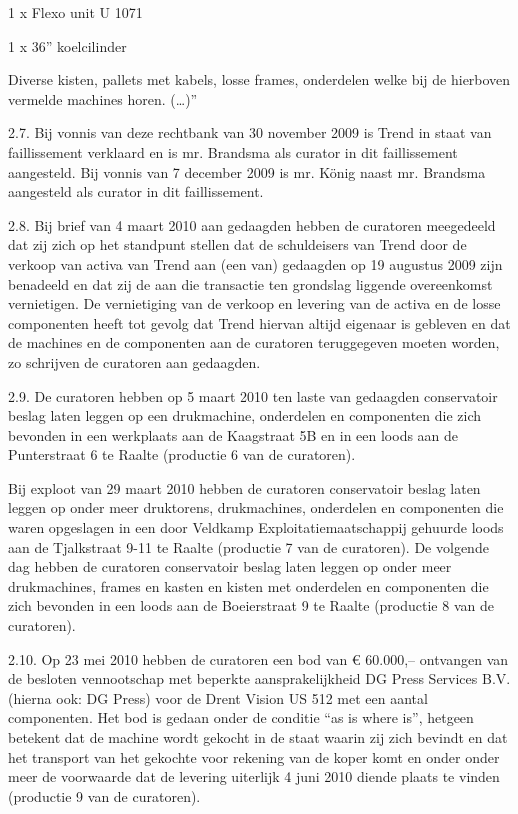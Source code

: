 \documentclass[
  dutch,
  a4paper,
]{article}
\begin{document}
1 x Flexo unit U 1071

1 x 36'' koelcilinder

Diverse kisten, pallets met kabels, losse frames, onderdelen welke bij de hierboven vermelde machines horen. (\ldots)''

2.7. Bij vonnis van deze rechtbank van 30 november 2009 is Trend in staat van faillissement verklaard en is mr. Brandsma als curator in dit faillissement aangesteld. Bij vonnis van 7 december 2009 is mr. König naast mr. Brandsma aangesteld als curator in dit faillissement.

2.8. Bij brief van 4 maart 2010 aan gedaagden hebben de curatoren meegedeeld dat zij zich op het standpunt stellen dat de schuldeisers van Trend door de verkoop van activa van Trend aan (een van) gedaagden op 19 augustus 2009 zijn benadeeld en dat zij de aan die transactie ten grondslag liggende overeenkomst vernietigen. De vernietiging van de verkoop en levering van de activa en de losse componenten heeft tot gevolg dat Trend hiervan altijd eigenaar is gebleven en dat de machines en de componenten aan de curatoren teruggegeven moeten worden, zo schrijven de curatoren aan gedaagden.

2.9. De curatoren hebben op 5 maart 2010 ten laste van gedaagden conservatoir beslag laten leggen op een drukmachine, onderdelen en componenten die zich bevonden in een werkplaats aan de Kaagstraat 5B en in een loods aan de Punterstraat 6 te Raalte (productie 6 van de curatoren).

Bij exploot van 29 maart 2010 hebben de curatoren conservatoir beslag laten leggen op onder meer druktorens, drukmachines, onderdelen en componenten die waren opgeslagen in een door Veldkamp Exploitatiemaatschappij gehuurde loods aan de Tjalkstraat 9-11 te Raalte (productie 7 van de curatoren). De volgende dag hebben de curatoren conservatoir beslag laten leggen op onder meer drukmachines, frames en kasten en kisten met onderdelen en componenten die zich bevonden in een loods aan de Boeierstraat 9 te Raalte (productie 8 van de curatoren).

2.10. Op 23 mei 2010 hebben de curatoren een bod van € 60.000,-- ontvangen van de besloten vennootschap met beperkte aansprakelijkheid DG Press Services B.V. (hierna ook: DG Press) voor de Drent Vision US 512 met een aantal componenten. Het bod is gedaan onder de conditie ``as is where is'', hetgeen betekent dat de machine wordt gekocht in de staat waarin zij zich bevindt en dat het transport van het gekochte voor rekening van de koper komt en onder onder meer de voorwaarde dat de levering uiterlijk 4 juni 2010 diende plaats te vinden (productie 9 van de curatoren).
\end{document}
